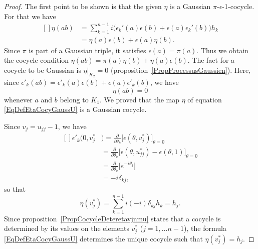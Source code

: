 \begin{proof}

	The first point to be shown is that the given $\eta$ is a Gaussian $\pi$-$\epsilon$-1-cocycle. For that we have
	\begin{equation}
		\begin{aligned}[]
			\eta(ab) & =\sum_{k=1}^{n-1}i\Big( \epsilon_k'(a)\epsilon(b)+\epsilon(a)\epsilon_k'(b) \Big)h_k \\
			         & =\eta(a)\epsilon(b)+\epsilon(a)\eta(b).
		\end{aligned}
	\end{equation}
	Since $\pi$ is part of a Gaussian triple, it satisfies $\epsilon(a)=\pi(a)$. Thus we obtain the cocycle condition $\eta(ab)=\pi(a)\eta(b)+\eta(a)\epsilon(b)$. The fact for a cocycle to be Gaussian is $\eta|_{K_2}=0$ (proposition~\ref{PropProcessusGaussien}). Here, since $\epsilon'_k(ab)=\epsilon'_k(a)\epsilon(b)+\epsilon(a)\epsilon'_k(b)$, we have
	\begin{equation}
		\eta(ab)=0
	\end{equation}
	whenever $a$ and $b$ belong to $K_1$. We proved that the map $\eta$ of equation \eqref{EqDefEtaCocyGaussU} is a Gaussian cocycle.

	Since $v_j=u_{jj}-1$, we have
	\begin{equation}
		\begin{aligned}[]
			\epsilon'_k(0,v_j^* & )=\frac{ \partial  }{ \partial \theta_k }\big[ \epsilon(\theta,v_j^*) \big]_{\theta=0}                      \\
			                    & =\frac{ \partial  }{ \partial \theta_k }\big[ \epsilon(\theta,u_{jj}^*)-\epsilon(\theta,1) \big]_{\theta=0} \\
			                    & =\frac{ \partial  }{ \partial \theta_k }\big[  e^{-i\theta_j} \big]                                         \\
			                    & =-i\delta_{kj},
		\end{aligned}
	\end{equation}
	so that
	\begin{equation}
		\eta(v_j^*)=\sum_{k=1}^{n-1}i(-i)\delta_{kj}h_k=h_j.
	\end{equation}
	Since proposition~\ref{PropCocycleDeteretavjnmu} states that a cocycle is determined by its values on the elements $v_j^*$ ($j=1,\ldots n-1$), the formula \eqref{EqDefEtaCocyGaussU} determines the unique cocycle such that $\eta(v_j^*)=h_j$.
\end{proof}


